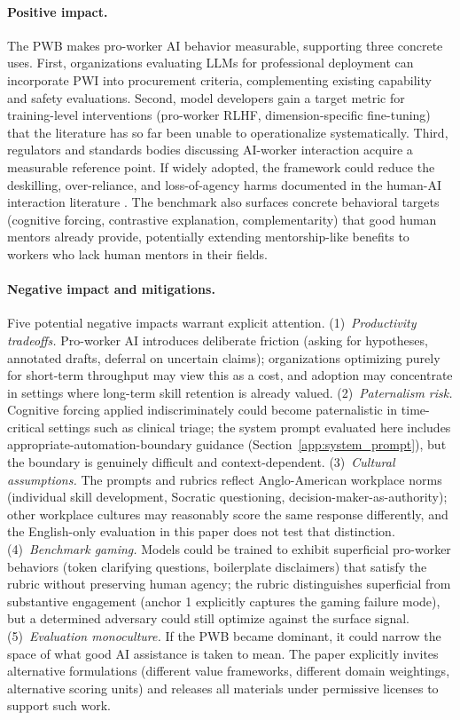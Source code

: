 \documentclass{article}
\begin{document}
\paragraph{Positive impact.} The PWB makes pro-worker AI behavior measurable, supporting three concrete uses. First, organizations evaluating LLMs for professional deployment can incorporate PWI into procurement criteria, complementing existing capability and safety evaluations. Second, model developers gain a target metric for training-level interventions (pro-worker RLHF, dimension-specific fine-tuning) that the literature has so far been unable to operationalize systematically. Third, regulators and standards bodies discussing AI-worker interaction acquire a measurable reference point. If widely adopted, the framework could reduce the deskilling, over-reliance, and loss-of-agency harms documented in the human-AI interaction literature \cite{bucinca2021trust,bucinca2024towards,gajos2022people}. The benchmark also surfaces concrete behavioral targets (cognitive forcing, contrastive explanation, complementarity) that good human mentors already provide, potentially extending mentorship-like benefits to workers who lack human mentors in their fields.

\paragraph{Negative impact and mitigations.} Five potential negative impacts warrant explicit attention. (1)~\emph{Productivity tradeoffs.} Pro-worker AI introduces deliberate friction (asking for hypotheses, annotated drafts, deferral on uncertain claims); organizations optimizing purely for short-term throughput may view this as a cost, and adoption may concentrate in settings where long-term skill retention is already valued. (2)~\emph{Paternalism risk.} Cognitive forcing applied indiscriminately could become paternalistic in time-critical settings such as clinical triage; the system prompt evaluated here includes appropriate-automation-boundary guidance (Section~\ref{app:system_prompt}), but the boundary is genuinely difficult and context-dependent. (3)~\emph{Cultural assumptions.} The prompts and rubrics reflect Anglo-American workplace norms (individual skill development, Socratic questioning, decision-maker-as-authority); other workplace cultures may reasonably score the same response differently, and the English-only evaluation in this paper does not test that distinction. (4)~\emph{Benchmark gaming.} Models could be trained to exhibit superficial pro-worker behaviors (token clarifying questions, boilerplate disclaimers) that satisfy the rubric without preserving human agency; the rubric distinguishes superficial from substantive engagement (anchor 1 explicitly captures the gaming failure mode), but a determined adversary could still optimize against the surface signal. (5)~\emph{Evaluation monoculture.} If the PWB became dominant, it could narrow the space of what good AI assistance is taken to mean. The paper explicitly invites alternative formulations (different value frameworks, different domain weightings, alternative scoring units) and releases all materials under permissive licenses to support such work.
\end{document}
